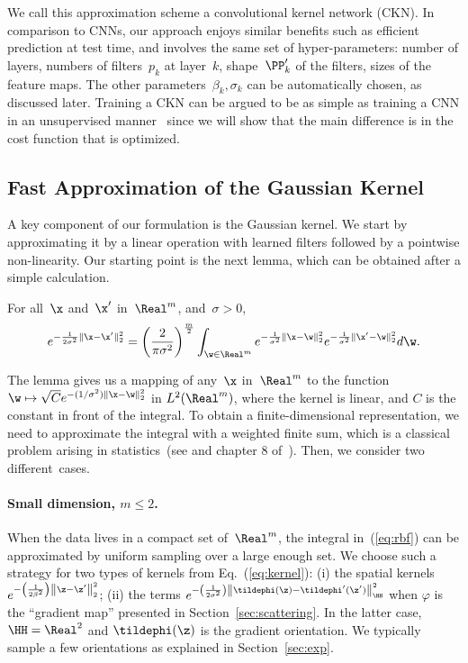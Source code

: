 We call this approximation scheme a convolutional kernel network
(CKN). In comparison to CNNs, our approach enjoys similar benefits such as efficient prediction at test
time, and involves the same set of hyper-parameters: number of layers, numbers
of filters~$p_k$ at layer~$k$, shape~$\PP_k'$ of the filters, sizes of the feature maps.
The other parameters~$\beta_k, \sigma_k$ can be automatically chosen, as
discussed later. Training a CKN can be argued to be as simple as
training a CNN in an unsupervised manner~\cite{ranzato2007} since we will show that
the main difference is in the cost function that is optimized.


\subsection{Fast Approximation of the Gaussian Kernel}\label{subsec:approx_gaussian}
A key component of our formulation is the Gaussian kernel. We start by
approximating it by a linear operation with learned filters followed by a
pointwise non-linearity.  Our starting point is the next lemma, which can be
obtained after a simple calculation.
\begin{lemma}
   For all~$\x$ and~$\x'$ in~$\Real^m$, and~$\sigma > 0$, 
   \begin{equation}
      e^{-\frac{1}{2\sigma^2}\|\x-\x'\|_2^2} = \left(\frac{2}{\pi \sigma^2}\right)^{\frac{m}{2}} \int_{\w \in \Real^m} e^{-\frac{1}{\sigma^2}\|\x-\w\|_2^2}e^{-\frac{1}{\sigma^2}\|\x'-\w\|_2^2} d\w.\label{eq:rbf}
   \end{equation}
\end{lemma}
The lemma gives us a mapping of any~$\x$ in~$\Real^m$ to the function $\w
\mapsto \sqrt{C} e^{-(1/\sigma^2)\|\x-\w\|_2^2}$ in $L^2(\Real^m)$, where the
kernel is linear, and $C$ is the constant in front of the integral. 
To obtain a finite-dimensional representation, we need
to approximate the integral with a weighted finite sum, which is a
classical problem arising in statistics~(see \cite{wahba} and chapter 8 of~\cite{bottou2007}). 
Then, we consider two different~cases.
\vspace*{-0.2cm}
\paragraph{Small dimension, $m \leq 2$.}
When the data lives in a compact set of~$\Real^m$, the
integral in~(\ref{eq:rbf}) can be approximated by uniform sampling over a large
enough set. We choose such a strategy for two types of kernels from Eq.~(\ref{eq:kernel}):
(i) the spatial kernels~$e^{-\left(\frac{1}{2\beta^2}\right)\left\|\z-\z'\right\|_2^2}$;
(ii) the terms $e^{-\left(\frac{1}{2\sigma^2}\right)\left\|\tildephi(\z)-\tildephi'(\z')\right\|_\HH^2}$ when
$\varphi$ is the ``gradient map'' presented in Section~\ref{sec:scattering}. In
the latter case, $\HH = \Real^2$ and $\tildephi(\z)$ is the gradient orientation.
We typically sample a few orientations as explained in Section~\ref{sec:exp}.

